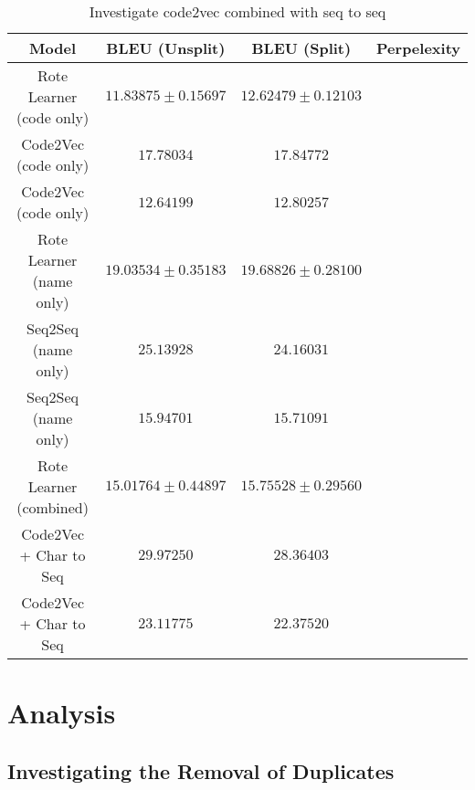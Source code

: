 \begin{table}[h!]
\begin{center}
\begin{tabular}{ c | c | c | c }
    Model                             & BLEU (Unsplit)  & BLEU (Split)    & Perpelexity \\
    \hline
    Rote Learner  (code only)        & $ 11.83875 \pm  0.15697 $ & $ 12.62479 \pm 0.12103 $ & \\
    Code2Vec  (code only)             & $ 17.78034 $ & $ 17.84772 $ & \\
    \hdashline
    Code2Vec  (code only)             & $ 12.64199 $ & $ 12.80257 $ & \\
    \hline
    \hline
    Rote Learner  (name only)         & $ 19.03534 \pm  0.35183 $ & $ 19.68826 \pm 0.28100 $ & \\
    Seq2Seq  (name only)              & $ 25.13928 $ & $ 24.16031 $ & \\
    \hdashline
    Seq2Seq  (name only)              & $ 15.94701 $ & $ 15.71091 $ & \\
    \hline
    \hline
    Rote Learner (combined)            & $ 15.01764 \pm  0.44897 $ & $ 15.75528 \pm 0.29560 $ & \\
    Code2Vec  + Char to Seq           & $ 29.97250 $ & $ 28.36403 $ & \\
    \hdashline
    Code2Vec  + Char to Seq           & $ 23.11775 $ & $ 22.37520 $ & \\
    \hline
\end{tabular}
\caption {Investigate code2vec combined with seq to seq}
\label{table:code2vec_embed}
\end{center}
\end{table}





\section{Analysis} %
\label{sec:analysis}


\subsection{Investigating the Removal of Duplicates} %
\label{sub:investigating_the_removal_of_duplicates}


